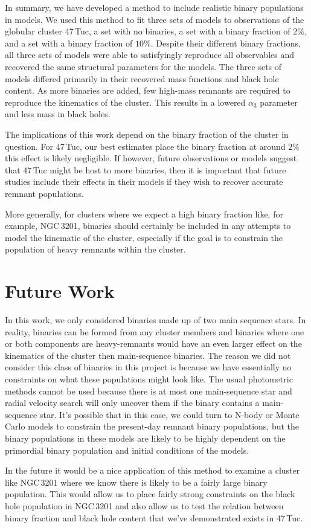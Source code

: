


In summary, we have developed a method to include realistic binary populations in 
models. We used this method to fit three sets of models to observations of the globular cluster
47\,Tuc, a set with no binaries, a set with a binary fraction of $2\%$, and a set with a binary
fraction of $10\%$. Despite their different binary fractions, all three sets of models were able to
satisfyingly reproduce all observables and recovered the same structural parameters for the models.
The three sets of models differed primarily in their recovered mass functions and black hole
content. As more binaries are added, few high-mass remnants are required to reproduce the kinematics
of the cluster. This results in a lowered $\alpha_3$ parameter and less mass in black holes.

The implications of this work depend on the binary fraction of the cluster in question. For 47\,Tuc,
our best estimates place the binary fraction at around $2\%$ this effect is likely negligible. If
however, future observations or models suggest that 47\,Tuc might be host to more binaries, then it
is important that future studies include their effects in their models if they wish to recover
accurate remnant populations.


More generally, for clusters where we expect a high binary fraction like, for example, NGC\,3201,
binaries should certainly be included in any attempts to model the kinematic of the cluster,
especially if the goal is to constrain the population of heavy remnants within the cluster.



\section{Future Work}



In this work, we only considered binaries made up of two main sequence stars. In reality, binaries
can be formed from any cluster members and binaries where one or both components are heavy-remnants
would have an even larger effect on the kinematics of the cluster then main-sequence binaries. The
reason we did not consider this class of binaries in this project is because we have essentially no
constraints on what these populations might look like. The usual photometric methods cannot be used
because there is at most one main-sequence star and radial velocity search will only uncover them if
the binary contains a main-sequence star. It's possible that in this case, we could turn to N-body
or Monte Carlo models to constrain the present-day remnant binary populations, but the binary
populations in these models are likely to be highly dependent on the primordial binary population
and initial conditions of the models.

In the future it would be a nice application of this method to examine a cluster like NGC\,3201
where we know there is likely to be a fairly large binary population. This would allow us to place
fairly strong constraints on the black hole population in NGC\,3201 and also allow us to test the
relation between binary fraction and black hole content that we've demonstrated exists in 47\,Tuc.